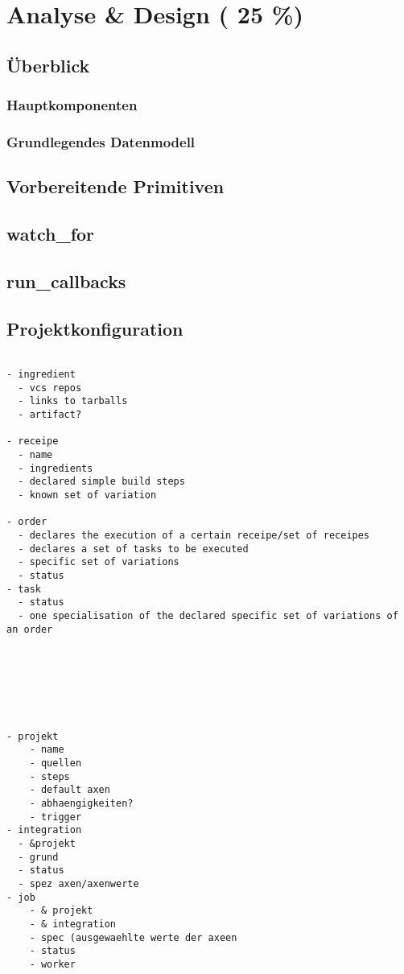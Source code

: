 \chapter{Analyse \& Design ( 25 \%)}


\section{\"Uberblick}
\subsection{Hauptkomponenten}
\subsection{Grundlegendes Datenmodell}

\section{Vorbereitende Primitiven}
\section{watch\_for}
\section{run\_callbacks}

\section{Projektkonfiguration}

\begin{verbatim}

- ingredient
  - vcs repos
  - links to tarballs
  - artifact?

- receipe
  - name
  - ingredients
  - declared simple build steps
  - known set of variation

- order
  - declares the execution of a certain receipe/set of receipes
  - declares a set of tasks to be executed
  - specific set of variations
  - status
- task
  - status
  - one specialisation of the declared specific set of variations of an order







- projekt
    - name
    - quellen
    - steps
    - default axen
    - abhaengigkeiten?
    - trigger
- integration
  - &projekt
  - grund
  - status
  - spez axen/axenwerte
- job
    - & projekt
    - & integration
    - spec (ausgewaehlte werte der axeen
    - status
    - worker


\end{verbatim}

